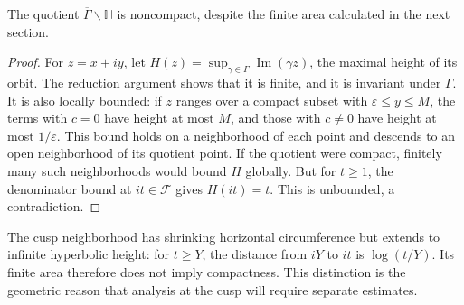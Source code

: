 \begin{proposition}[Noncompactness]\label{modular.noncompact}
The quotient $\overline\Gamma\backslash\mathbb H$ is noncompact, despite the finite area calculated in the next section.
\end{proposition}

\begin{proof}
For $z=x+iy$, let $H(z)=\sup_{\gamma\in\Gamma}\operatorname{Im}(\gamma z)$, the maximal height of its orbit. The reduction argument shows that it is finite, and it is invariant under $\Gamma$. It is also locally bounded: if $z$ ranges over a compact subset with $\varepsilon\leq y\leq M$, the terms with $c=0$ have height at most $M$, and those with $c\ne0$ have height at most $1/\varepsilon$. This bound holds on a neighborhood of each point and descends to an open neighborhood of its quotient point. If the quotient were compact, finitely many such neighborhoods would bound $H$ globally. But for $t\geq1$, the denominator bound at $it\in\mathcal F$ gives $H(it)=t$. This is unbounded, a contradiction.
\end{proof}

The cusp neighborhood has shrinking horizontal circumference but extends to infinite hyperbolic height: for $t\geq Y$, the distance from $iY$ to $it$ is $\log(t/Y)$. Its finite area therefore does not imply compactness. This distinction is the geometric reason that analysis at the cusp will require separate estimates.

